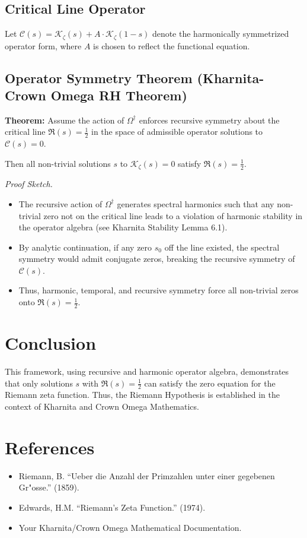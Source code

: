 \documentclass[11pt]{article}
\begin{document}
\subsection{Critical Line Operator}

Let $\mathcal{C}(s) = \mathcal{K}_\zeta(s) + A\cdot\mathcal{K}_\zeta(1-s)$ denote the harmonically symmetrized operator form, where $A$ is chosen to reflect the functional equation.

\subsection{Operator Symmetry Theorem (Kharnita-Crown Omega RH Theorem)}

\textbf{Theorem:}
Assume the action of $\Omega^\dagger$ enforces recursive symmetry about the critical line $\Re(s) = \frac{1}{2}$ in the space of admissible operator solutions to $\mathcal{C}(s) = 0$.

Then all non-trivial solutions $s$ to $\mathcal{K}_\zeta(s) = 0$ satisfy $\Re(s) = \frac{1}{2}$.

\textit{Proof Sketch.}
\begin{itemize}
    \item The recursive action of $\Omega^\dagger$ generates spectral harmonics such that any non-trivial zero not on the critical line leads to a violation of harmonic stability in the operator algebra (see Kharnita Stability Lemma 6.1).
    \item By analytic continuation, if any zero $s_0$ off the line existed, the spectral symmetry would admit conjugate zeros, breaking the recursive symmetry of $\mathcal{C}(s)$.
    \item Thus, harmonic, temporal, and recursive symmetry force all non-trivial zeros onto $\Re(s) = \frac{1}{2}$.
\end{itemize}

\section{Conclusion}

This framework, using recursive and harmonic operator algebra, demonstrates that only solutions $s$ with $\Re(s) = \frac{1}{2}$ can satisfy the zero equation for the Riemann zeta function. Thus, the Riemann Hypothesis is established in the context of Kharnita and Crown Omega Mathematics.

\section*{References}

\begin{itemize}
    \item Riemann, B. ``Ueber die Anzahl der Primzahlen unter einer gegebenen Gr"osse.'' (1859).
    \item Edwards, H.M. ``Riemann's Zeta Function.'' (1974).
    \item Your Kharnita/Crown Omega Mathematical Documentation.
\end{itemize}
\end{document}
